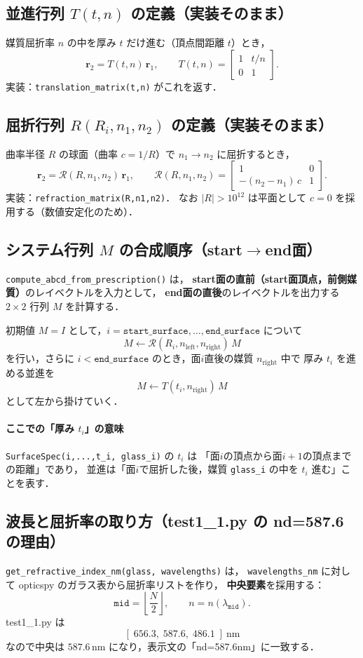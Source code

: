 \documentclass[a4paper,11pt]{jsarticle} %
\begin{document}
\subsection{並進行列 $T(t,n)$ の定義（実装そのまま）}
媒質屈折率 $n$ の中を厚み $t$ だけ進む（頂点間距離 $t$）とき，
\[
\mathbf{r}_2 = T(t,n)\,\mathbf{r}_1,\qquad
T(t,n)=
\begin{bmatrix}
1 & t/n\\
0 & 1
\end{bmatrix}.
\]
実装：\texttt{translation\_matrix(t,n)} がこれを返す．

\subsection{屈折行列 $R(R_i,n_1,n_2)$ の定義（実装そのまま）}
曲率半径 $R$ の球面（曲率 $c=1/R$）で $n_1\rightarrow n_2$ に屈折するとき，
\[
\mathbf{r}_2 = \mathcal{R}(R,n_1,n_2)\,\mathbf{r}_1,\qquad
\mathcal{R}(R,n_1,n_2)=
\begin{bmatrix}
1 & 0\\
-(n_2-n_1)\,c & 1
\end{bmatrix}.
\]
実装：\texttt{refraction\_matrix(R,n1,n2)}．
なお $|R|>10^{12}$ は平面として $c=0$ を採用する（数値安定化のため）．

\subsection{システム行列 $M$ の合成順序（start$\to$end面）}
\texttt{compute\_abcd\_from\_prescription()} は，
\textbf{start面の直前（start面頂点，前側媒質）}のレイベクトルを入力として，
\textbf{end面の直後}のレイベクトルを出力する $2\times 2$ 行列 $M$ を計算する．

初期値 $M=I$ として，$i=\texttt{start\_surface},\dots,\texttt{end\_surface}$ について
\[
M \leftarrow \mathcal{R}(R_i,n_{\text{left}},n_{\text{right}})\,M
\]
を行い，さらに $i<\texttt{end\_surface}$ のとき，面$i$直後の媒質 $n_{\text{right}}$ 中で
厚み $t_i$ を進める並進を
\[
M \leftarrow T(t_i,n_{\text{right}})\,M
\]
として左から掛けていく．

\paragraph{ここでの「厚み $t_i$」の意味}
\texttt{SurfaceSpec(i,...,t\_i, glass\_i)} の $t_i$ は
「面$i$の頂点から面$i+1$の頂点までの距離」であり，
並進は「面$i$で屈折した後，媒質 \texttt{glass\_i} の中を $t_i$ 進む」ことを表す．

\subsection{波長と屈折率の取り方（test1\_1.py の nd=587.6 の理由）}
\texttt{get\_refractive\_index\_nm(glass, wavelengths)} は，
\texttt{wavelengths\_nm} に対して opticspy のガラス表から屈折率リストを作り，
\textbf{中央要素}を採用する：
\[
\texttt{mid}=\left\lfloor \frac{N}{2}\right\rfloor,\qquad n = n(\lambda_{\texttt{mid}}).
\]
test1\_1.py は
\[
[\;656.3,\;587.6,\;486.1\;]\ \mathrm{nm}
\]
なので中央は $587.6\,\mathrm{nm}$ になり，表示文の「nd=587.6nm」に一致する．
\end{document}
